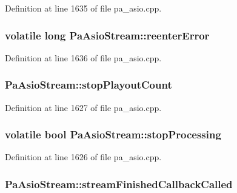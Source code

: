 Definition at line 1635 of file pa\+\_\+asio.\+cpp.

\subsubsection[{\texorpdfstring{reenter\+Error}{reenterError}}]{\setlength{\rightskip}{0pt plus 5cm}volatile long Pa\+Asio\+Stream\+::reenter\+Error}\hypertarget{struct_pa_asio_stream_a9e032d37004fd0385330108fad387ccc}{}\label{struct_pa_asio_stream_a9e032d37004fd0385330108fad387ccc}


Definition at line 1636 of file pa\+\_\+asio.\+cpp.

\subsubsection[{\texorpdfstring{stop\+Playout\+Count}{stopPlayoutCount}}]{ Pa\+Asio\+Stream\+::stop\+Playout\+Count}\hypertarget{struct_pa_asio_stream_a64c1de9b0213087469905a2934227bd4}{}\label{struct_pa_asio_stream_a64c1de9b0213087469905a2934227bd4}


Definition at line 1627 of file pa\+\_\+asio.\+cpp.

\subsubsection[{\texorpdfstring{stop\+Processing}{stopProcessing}}]{\setlength{\rightskip}{0pt plus 5cm}volatile {\bf bool} Pa\+Asio\+Stream\+::stop\+Processing}\hypertarget{struct_pa_asio_stream_a138a1dc47e2ad061591f9d8dc7d07926}{}\label{struct_pa_asio_stream_a138a1dc47e2ad061591f9d8dc7d07926}


Definition at line 1626 of file pa\+\_\+asio.\+cpp.

\subsubsection[{\texorpdfstring{stream\+Finished\+Callback\+Called}{streamFinishedCallbackCalled}}]{ Pa\+Asio\+Stream\+::stream\+Finished\+Callback\+Called}\hypertarget{struct_pa_asio_stream_ad53dcc5be9046ad25a61359aa3010796}{}\label{struct_pa_asio_stream_ad53dcc5be9046ad25a61359aa3010796}


